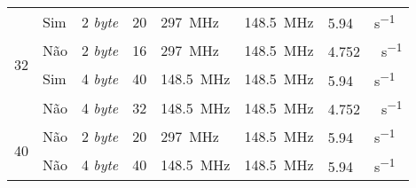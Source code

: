 \begin{table}[h!]
{\begin{tabular}{@{}lllllll@{}}
			\multirow{4}{*}{32}                                                        & Sim                                                                    & 2 \textit{byte}                                                                  & 20                                                                                 & \SI{297}{\mega\hertz}                & \SI{148.5}{\mega\hertz}               & \SI{5.94}{\giga\bit\per\second}                                                              \\
			& Não                                                                    & 2 \textit{byte}                                                                  & 16                                                                                 & \SI{297}{\mega\hertz}                & \SI{148.5}{\mega\hertz}               & \SI{4,752}{\giga\bit\per\second}                                                              \\
			& Sim                                                                    & 4 \textit{byte}                                                                  & 40                                                                                 & \SI{148.5}{\mega\hertz}             & \SI{148.5}{\mega\hertz}               & \SI{5.94}{\giga\bit\per\second}                                                               \\
			& Não                                                                    & 4 \textit{byte}                                                                  & 32                                                                                 & \SI{148.5}{\mega\hertz}              & \SI{148.5}{\mega\hertz}               & \SI{4.752}{\giga\bit\per\second}                                                              \\ \hline
			\multirow{2}{*}{40}                                                        & Não                                                                    & 2 \textit{byte}                                                                  & 20                                                                                 & \SI{297}{\mega\hertz}                & \SI{148.5}{\mega\hertz}               & \SI{5.94}{\giga\bit\per\second}                                                               \\
			& Não                                                                    & 4 \textit{byte}                                                                  & 40                                                                                 & \SI{148.5}{\mega\hertz}             & \SI{148.5}{\mega\hertz}               & \SI{5.94}{\giga\bit\per\second}                                                               \\ \hline

\end{tabular}}
\end{table}
